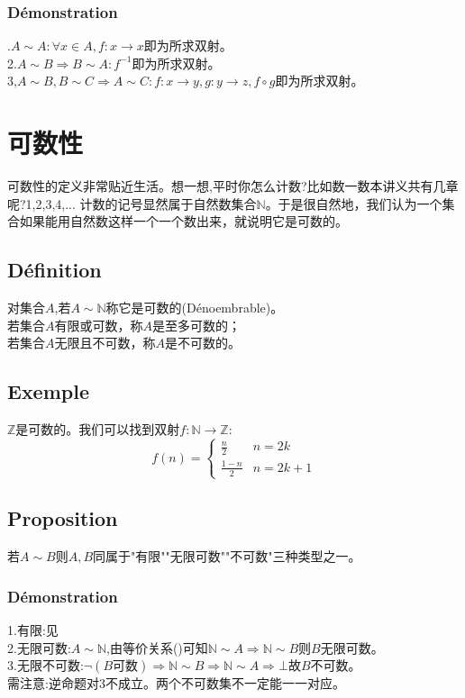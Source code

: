 \documentclass[12pt, a4paper, oneside]{ctexbook}
\begin{document}
  \subsubsection{Démonstration}
  .$A\sim A:\forall x\in A, f:x\rightarrow x$即为所求双射。\\
  2.$A\sim B\Rightarrow B\sim A: f^{-1}$即为所求双射。\\
  3,$A\sim B,B\sim C\Rightarrow A\sim C:f:x\rightarrow y,g:y\rightarrow z,f\circ g $即为所求双射。\\
  
\section{可数性}
  可数性的定义非常贴近生活。想一想,平时你怎么计数?比如数一数本讲义共有几章呢?1,2,3,4,...
  计数的记号显然属于自然数集合$\mathbb{N}$。于是很自然地，我们认为一个集合如果能用自然数这样一个一个数出来，就说明它是可数的。
  \subsection{Définition}
  \noindent 
  对集合$A$,若$A\sim\mathbb{N} $称它是可数的(Dénoembrable)。\\
  若集合$A$有限或可数，称$A$是至多可数的；\\
  若集合$A$无限且不可数，称$A$是不可数的。
  \subsection{Exemple}\label{myref:Z可数}
  $\mathbb{Z}$是可数的。我们可以找到双射$f:\mathbb{N}\rightarrow\mathbb{Z}$:
  $$
    f(n)=\begin{cases}
    \frac{n}{2} &n=2k\\
    \frac{1-n}{2} &n=2k+1
    \end{cases}
  $$
  \subsection{Proposition}
  若$A\sim B$则$A,B$同属于"有限""无限可数""不可数"三种类型之一。
  \subsubsection{Démonstration}
  \noindent
  1.有限:见 \\
  2.无限可数:$A\sim \mathbb{N}$,由等价关系()可知$\mathbb{N}\sim A\Rightarrow\mathbb{N}\sim B$则$B$无限可数。\\
  3.无限不可数:$\lnot(B\text{可数})\Rightarrow\mathbb{N}\sim B\Rightarrow\mathbb{N}\sim A\Rightarrow\bot$故$B$不可数。\\
  需注意:逆命题对3不成立。两个不可数集不一定能一一对应。
\end{document}
